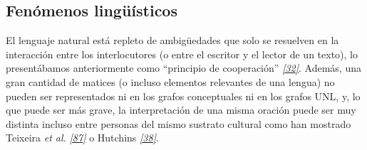 \documentclass[a4paper,12pt,spanish]{book}
\begin{document}
\subsection{Fenómenos lingüísticos}
\label{1.state-of-the-art/iii.distancia-semantica:fenomenos-linguisticos}\label{1.state-of-the-art/iii.distancia-semantica:id1}
El lenguaje natural está repleto de ambigüedades que solo se resuelven en la interacción
entre los interlocutores (o entre el escritor y el lector de un texto), lo presentábamos
anteriormente como ``principio de cooperación'' \label{1.state-of-the-art/iii.distancia-semantica:id2}{\hyperref[zreferences:grice1975]{\emph{{[}32{]}}}}. Además, una gran cantidad
de matices (o incluso elementos relevantes de una lengua) no pueden ser representados
ni en los grafos conceptuales ni en los grafos UNL, y, lo que puede ser más grave, la
interpretación de una misma oración puede ser muy distinta incluso entre personas del
mismo sustrato cultural como han mostrado Teixeira \emph{et al.} \label{1.state-of-the-art/iii.distancia-semantica:id3}{\hyperref[zreferences:martins2002]{\emph{{[}87{]}}}} o
Hutchins \label{1.state-of-the-art/iii.distancia-semantica:id4}{\hyperref[zreferences:hutchins1992]{\emph{{[}38{]}}}}.
\end{document}
